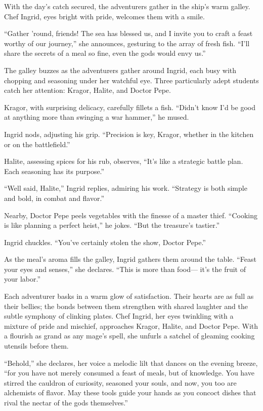\documentclass[
  letterpaper,12pt,twoside,twocolumn,openany,
  nodeprecatedcode,bg=full]{dndbook}
\begin{document}
With the day's catch secured, the adventurers gather in the ship's warm
galley. Chef Ingrid, eyes bright with pride, welcomes them with a smile.

``Gather 'round, friends! The sea has blessed us, and I invite you to
craft a feast worthy of our journey,'' she announces, gesturing to the
array of fresh fish. ``I'll share the secrets of a meal so fine, even
the gods would envy us.''

The galley buzzes as the adventurers gather around Ingrid, each busy
with chopping and seasoning under her watchful eye. Three particularly
adept students catch her attention: Kragor, Halite, and Doctor Pepe.

Kragor, with surprising delicacy, carefully fillets a fish. ``Didn't
know I'd be good at anything more than swinging a war hammer,'' he
mused.

Ingrid nods, adjusting his grip. ``Precision is key, Kragor, whether in
the kitchen or on the battlefield.''

Halite, assessing spices for his rub, observes, ``It's like a strategic
battle plan. Each seasoning has its purpose.''

``Well said, Halite,'' Ingrid replies, admiring his work. ``Strategy is
both simple and bold, in combat and flavor.''

Nearby, Doctor Pepe peels vegetables with the finesse of a master thief.
``Cooking is like planning a perfect heist,'' he jokes. ``But the
treasure's tastier.''

Ingrid chuckles. ``You've certainly stolen the show, Doctor Pepe.''

As the meal's aroma fills the galley, Ingrid gathers them around the
table. ``Feast your eyes and senses,'' she declares. ``This is more than
food--- it's the fruit of your labor.''

Each adventurer basks in a warm glow of satisfaction. Their hearts are
as full as their bellies; the bonds between them strengthen with shared
laughter and the subtle symphony of clinking plates. Chef Ingrid, her
eyes twinkling with a mixture of pride and mischief, approaches Kragor,
Halite, and Doctor Pepe. With a flourish as grand as any mage's spell,
she unfurls a satchel of gleaming cooking utensils before them.

``Behold,'' she declares, her voice a melodic lilt that dances on the
evening breeze, ``for you have not merely consumed a feast of meals, but
of knowledge. You have stirred the cauldron of curiosity, seasoned your
souls, and now, you too are alchemists of flavor. May these tools guide
your hands as you concoct dishes that rival the nectar of the gods
themselves.''
\end{document}
